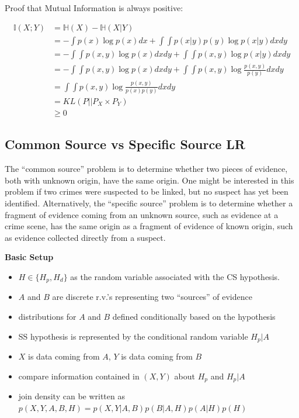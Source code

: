 \documentclass[]{book}
\providecommand{\tightlist}{%
  \setlength{\itemsep}{0pt}\setlength{\parskip}{0pt}}
\begin{document}
Proof that Mutual Information is always positive:

\begin{align*}
\mathbb{I}(X;Y) &= \mathbb{H}(X) - \mathbb{H}(X|Y) \\
&= -\int{p(x) \log p(x) dx} + \int{\int{p(x|y)p(y) \log p(x|y) dx} dy} \\
&= -\int{\int{p(x,y) \log p(x) dx}dy} + \int{\int{p(x,y) \log p(x|y) dx} dy} \\
&= -\int{\int{p(x,y) \log p(x) dx}dy} + \int{\int{p(x,y) \log \frac{p(x,y)}{p(y)} dx} dy} \\
&= \int{\int{p(x,y) \log \frac{p(x,y)}{p(x)p(y)} dx}dy} \\
&= KL(P||P_{X} \times P_{Y}) \\
&\geq 0
\end{align*}

\hypertarget{common-source-vs-specific-source-lr}{%
\subsection{Common Source vs Specific Source LR}\label{common-source-vs-specific-source-lr}}

The ``common source'' problem is to determine whether two pieces of evidence, both with unknown origin, have the same origin. One might be interested in this problem if two crimes were suspected to be linked, but no suspect has yet been identified. Alternatively, the ``specific source'' problem is to determine whether a fragment of evidence coming from an unknown source, such as evidence at a crime scene, has the same origin as a fragment of evidence of known origin, such as evidence collected directly from a suspect.

\textbf{Basic Setup}

\begin{itemize}
\tightlist
\item
  \(H \in \{ H_p, H_d \}\) as the random variable associated with the CS hypothesis.
\item
  \(A\) and \(B\) are discrete r.v.'s representing two ``sources'' of evidence
\item
  distributions for \(A\) and \(B\) defined conditionally based on the hypothesis
\item
  SS hypothesis is represented by the conditional random variable \(H_p|A\)
\item
  \(X\) is data coming from \(A\), \(Y\) is data coming from \(B\)
\item
  compare information contained in \((X,Y)\) about \(H_p\) and \(H_p|A\)
\item
  join density can be written as \(p(X,Y,A,B,H) = p(X,Y|A,B)p(B|A,H)p(A|H)p(H)\)
\end{itemize}
\end{document}
